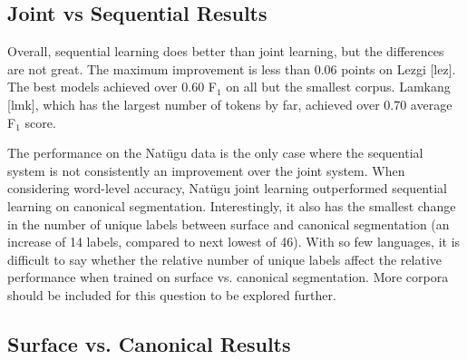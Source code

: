 \subsection{Joint vs Sequential Results}

Overall, sequential learning does better than joint learning, but the differences are not great. The maximum improvement is less than 0.06 points on Lezgi [lez]. The best models achieved over 0.60 F$_1$ on all but the smallest corpus. Lamkang [lmk], which has the largest number of tokens by far, achieved over 0.70 average F$_1$ score. 

The performance on the Nat\"ugu data is the only case where the sequential system is not consistently an improvement over the joint system. 
When considering word-level accuracy, Nat\"ugu joint learning outperformed sequential learning on canonical segmentation. Interestingly, it also has the smallest change in the number of unique labels between surface and canonical segmentation (an increase of 14 labels, compared to next lowest of 46). With so few languages, it is difficult to say whether the relative number of unique labels affect the relative performance when trained on surface vs. canonical segmentation. More corpora should be included for this question to be explored further. %
 
\subsection{Surface vs. Canonical Results}

